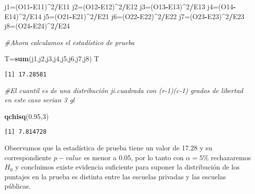 \documentclass[
  a4paper,
  oneside,
  openany]{book}
\newenvironment{Shaded}{\begin{snugshade}}{\end{snugshade}}
\newcommand{\CommentTok}[1]{\textcolor[rgb]{0.56,0.35,0.01}{\textit{#1}}}
\newcommand{\DecValTok}[1]{\textcolor[rgb]{0.00,0.00,0.81}{#1}}
\newcommand{\FloatTok}[1]{\textcolor[rgb]{0.00,0.00,0.81}{#1}}
\newcommand{\FunctionTok}[1]{\textcolor[rgb]{0.13,0.29,0.53}{\textbf{#1}}}
\newcommand{\NormalTok}[1]{#1}
\newcommand{\OtherTok}[1]{\textcolor[rgb]{0.56,0.35,0.01}{#1}}
\newcommand{\SpecialCharTok}[1]{\textcolor[rgb]{0.81,0.36,0.00}{\textbf{#1}}}
\begin{document}
\begin{Shaded}
\begin{Highlighting}[]
\NormalTok{j1}\OtherTok{=}\NormalTok{(O11}\SpecialCharTok{{-}}\NormalTok{E11)}\SpecialCharTok{\^{}}\DecValTok{2}\SpecialCharTok{/}\NormalTok{E11}
\NormalTok{j2}\OtherTok{=}\NormalTok{(O12}\SpecialCharTok{{-}}\NormalTok{E12)}\SpecialCharTok{\^{}}\DecValTok{2}\SpecialCharTok{/}\NormalTok{E12}
\NormalTok{j3}\OtherTok{=}\NormalTok{(O13}\SpecialCharTok{{-}}\NormalTok{E13)}\SpecialCharTok{\^{}}\DecValTok{2}\SpecialCharTok{/}\NormalTok{E13}
\NormalTok{j4}\OtherTok{=}\NormalTok{(O14}\SpecialCharTok{{-}}\NormalTok{E14)}\SpecialCharTok{\^{}}\DecValTok{2}\SpecialCharTok{/}\NormalTok{E14}
\NormalTok{j5}\OtherTok{=}\NormalTok{(O21}\SpecialCharTok{{-}}\NormalTok{E21)}\SpecialCharTok{\^{}}\DecValTok{2}\SpecialCharTok{/}\NormalTok{E21}
\NormalTok{j6}\OtherTok{=}\NormalTok{(O22}\SpecialCharTok{{-}}\NormalTok{E22)}\SpecialCharTok{\^{}}\DecValTok{2}\SpecialCharTok{/}\NormalTok{E22}
\NormalTok{j7}\OtherTok{=}\NormalTok{(O23}\SpecialCharTok{{-}}\NormalTok{E23)}\SpecialCharTok{\^{}}\DecValTok{2}\SpecialCharTok{/}\NormalTok{E23}
\NormalTok{j8}\OtherTok{=}\NormalTok{(O24}\SpecialCharTok{{-}}\NormalTok{E24)}\SpecialCharTok{\^{}}\DecValTok{2}\SpecialCharTok{/}\NormalTok{E24}

\CommentTok{\#Ahora calculamos el estadístico de prueba}

\NormalTok{T}\OtherTok{=}\FunctionTok{sum}\NormalTok{(j1,j2,j3,j4,j5,j6,j7,j8)}
\NormalTok{T}
\end{Highlighting}
\end{Shaded}

\begin{verbatim}
[1] 17.28581
\end{verbatim}

\begin{Shaded}
\begin{Highlighting}[]
\CommentTok{\#El cuantil es de una distribución ji.cuadrada con (r{-}1)(c{-}1) grados de libertad en este caso serian 3 gl}

\FunctionTok{qchisq}\NormalTok{(}\FloatTok{0.95}\NormalTok{,}\DecValTok{3}\NormalTok{)}
\end{Highlighting}
\end{Shaded}

\begin{verbatim}
[1] 7.814728
\end{verbatim}

Observamos que la estadística de prueba tiene un valor de 17.28 y su correspondiente \(p-value\) es menor a 0.05, por lo tanto con \(\alpha=5\%\) rechazaremos \(H_0\) y concluimos existe evidencia suficiente para suponer la distribución de los puntajes en la prueba es distinta entre las escuelas privadas y las escuelas públicas.
\end{document}
